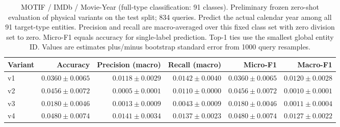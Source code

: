 \begin{table}[htbp]
\centering
\small
\begin{adjustbox}{max width=\linewidth}
\begin{tabular}{lrrrrr}
\toprule
Variant & Accuracy & Precision (macro) & Recall (macro) & Micro-F1 & Macro-F1 \\
\midrule
v1 & $0.0360 \pm 0.0065$ & $0.0118 \pm 0.0029$ & $0.0142 \pm 0.0040$ & $0.0360 \pm 0.0065$ & $0.0120 \pm 0.0028$ \\
v2 & $0.0456 \pm 0.0072$ & $0.0005 \pm 0.0001$ & $0.0110 \pm 0.0000$ & $0.0456 \pm 0.0072$ & $0.0010 \pm 0.0001$ \\
v3 & $0.0180 \pm 0.0046$ & $0.0013 \pm 0.0009$ & $0.0043 \pm 0.0009$ & $0.0180 \pm 0.0046$ & $0.0011 \pm 0.0004$ \\
v4 & $0.0480 \pm 0.0074$ & $0.0141 \pm 0.0034$ & $0.0137 \pm 0.0023$ & $0.0480 \pm 0.0074$ & $0.0127 \pm 0.0022$ \\
\bottomrule
\end{tabular}
\end{adjustbox}
\caption{MOTIF / IMDb / Movie-Year (full-type classification: 91 classes). Preliminary frozen zero-shot evaluation of physical variants on the test split; 834 queries. Predict the actual calendar year among all 91 target-type entities. Precision and recall are macro-averaged over this fixed class set with zero division set to zero. Micro-F1 equals accuracy for single-label prediction. Top-1 ties use the smallest global entity ID. Values are estimates plus/minus bootstrap standard error from 1000 query resamples.}
\label{tab:motif-imdb-movie-year-classification}
\end{table}
